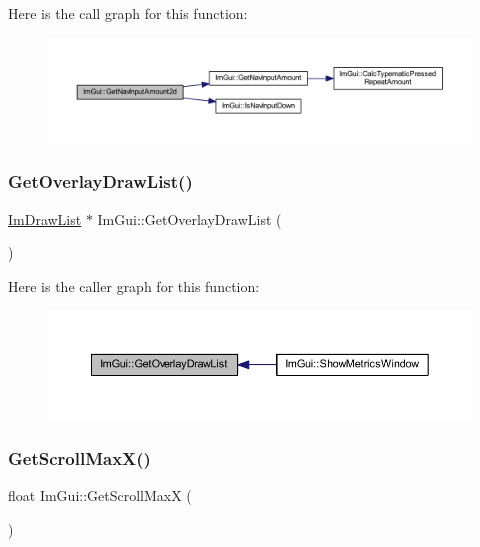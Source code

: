 Here is the call graph for this function\+:
\nopagebreak
\begin{figure}[H]
\begin{center}
\leavevmode
\includegraphics[width=350pt]{namespace_im_gui_a7b84c4630dad4ef5d07b366d36c39476_cgraph}
\end{center}
\end{figure}
\mbox{\label{namespace_im_gui_aa992d915c56bb56a87737964352614ae}} 
\subsubsection{\texorpdfstring{Get\+Overlay\+Draw\+List()}{GetOverlayDrawList()}}
{\footnotesize\ttfamily \mbox{\hyperlink{struct_im_draw_list}{Im\+Draw\+List}} $\ast$ Im\+Gui\+::\+Get\+Overlay\+Draw\+List (\begin{DoxyParamCaption}{ }\end{DoxyParamCaption})}

Here is the caller graph for this function\+:
\nopagebreak
\begin{figure}[H]
\begin{center}
\leavevmode
\includegraphics[width=350pt]{namespace_im_gui_aa992d915c56bb56a87737964352614ae_icgraph}
\end{center}
\end{figure}
\mbox{\label{namespace_im_gui_af472cb090157c22e65a0aa1662b9f3d0}} 
\subsubsection{\texorpdfstring{Get\+Scroll\+Max\+X()}{GetScrollMaxX()}}
{\footnotesize\ttfamily float Im\+Gui\+::\+Get\+Scroll\+MaxX (\begin{DoxyParamCaption}{ }\end{DoxyParamCaption})}

